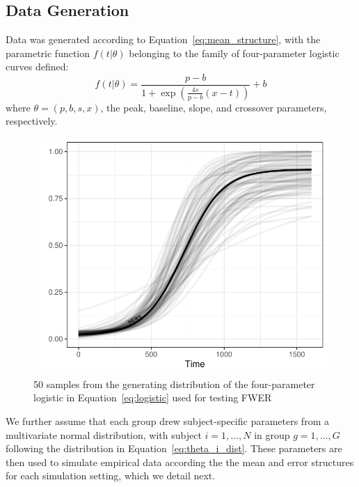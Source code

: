 \documentclass{article}
\begin{document}
\subsection{Data Generation}

Data was generated according to Equation~\ref{eq:mean_structure}, with the parametric function $f(t|\theta)$ belonging to the family of four-parameter logistic curves defined:
\begin{equation}\label{eq:logistic}
f(t | \theta) = \frac{p-b}{1 + \exp \left(\frac{4s}{\text{p}-b} (x - t) \right)} + b
\end{equation}
where $\theta = (p, b, s, x)$, the peak, baseline, slope, and crossover parameters, respectively.



\begin{figure}
    \centering
\includegraphics{log_dist_2.pdf}
    \caption{50 samples from the generating distribution of the four-parameter logistic in Equation~\ref{eq:logistic} used for testing FWER}
\label{fig:distribution_log}
\end{figure}


We further assume that each group drew subject-specific parameters from a multivariate normal distribution, with subject $i = 1, \dots, N$ in group $g = 1, \dots, G$ following the distribution in Equation~\ref{eq:theta_i_dist}. These parameters are then used to simulate empirical data according the the mean and error structures for each simulation setting, which we detail next. 
\end{document}
